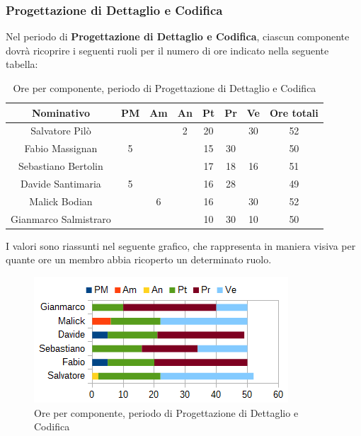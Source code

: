 		\subsubsection{Progettazione di Dettaglio e Codifica}
		Nel periodo di \textbf{Progettazione di Dettaglio e Codifica}, ciascun componente dovrà ricoprire i seguenti ruoli per il numero di ore indicato nella seguente tabella: \\
		\begin{table}[H]
		\centering
		\begin{tabular}{|c|c|c|c|c|c|c|c|}
			\hline
			\textbf{Nominativo}		& \textbf{PM}	& \textbf{Am}	& \textbf{An}	& \textbf{Pt}	& \textbf{Pr}	& \textbf{Ve}	& \textbf{Ore totali}     \\
			\hline
			Salvatore Pilò			& 		& 		& 2		& 20	&		& 30	& 52 \\
			Fabio Massignan			& 5		& 		&		& 15	& 30	& 		& 50 \\
			Sebastiano Bertolin		&		& 		& 		& 17	& 18	& 16	& 51 \\
			Davide Santimaria		& 5		& 		& 		& 16	& 28	&		& 49 \\
			Malick Bodian			& 		& 6		&		& 16	&		& 30	& 52 \\
			Gianmarco Salmistraro	&		& 		& 		& 10	& 30	& 10	& 50 \\
			\hline
		\end{tabular}
		\caption{Ore per componente, periodo di Progettazione di Dettaglio e Codifica}
		\end{table}
		I valori sono riassunti nel seguente grafico, che rappresenta in maniera visiva per quante ore un membro abbia ricoperto un determinato ruolo. \\
		\begin{figure}[H]
			\centering
			\includegraphics[width=1\linewidth]{immagini/grafici/progettazione_dettaglio_codifica-barra.png}
			\caption{Ore per componente, periodo di Progettazione di Dettaglio e Codifica}
		\end{figure}
